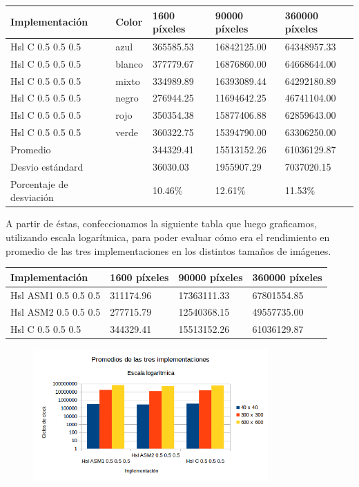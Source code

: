 \begin{tabular}{| l | l | l | l | l |}
\hline
Implementación & Color & 1600 píxeles & 90000 píxeles & 360000 píxeles\\
\hline
Hsl C 0.5 0.5 0.5 & azul &  365585.53 & 16842125.00 & 64348957.33\\ 
\hline
Hsl C 0.5 0.5 0.5 & blanco & 377779.67 & 16876860.00 & 64668644.00\\ 
\hline
Hsl C 0.5 0.5 0.5 & mixto & 334989.89 & 16393089.44 & 64292180.89\\ 
\hline
Hsl C 0.5 0.5 0.5 & negro & 276944.25 & 11694642.25 & 46741104.00\\
\hline
Hsl C 0.5 0.5 0.5 & rojo &  350354.38 & 15877406.88 & 62859643.00\\
\hline
Hsl C 0.5 0.5 0.5 & verde &  360322.75 & 15394790.00 & 63306250.00\\ 
\hline
Promedio & &  344329.41 & 15513152.26 & 61036129.87\\
\hline
Desvio estándard  &&  36030.03  & 1955907.29 & 7037020.15\\
\hline
Porcentaje de desviación  && 10.46\% & 12.61\% &  11.53\%\\
\hline
\end{tabular}

A partir de éstas, confeccionamos la siguiente tabla que luego graficamos, utilizando escala logarítmica, para poder evaluar cómo era el rendimiento en promedio de las tres implementaciones en los distintos tamaños de imágenes.\\

\begin{tabular}{| l | l | l | l|}
\hline
Implementación	& 1600 píxeles & 90000 píxeles & 360000 píxeles\\
\hline
Hsl ASM1 0.5 0.5 0.5	& 311174.96	& 17363111.33 & 	67801554.85\\
\hline
Hsl ASM2 0.5 0.5 0.5	& 277715.79	& 12540368.15	& 49557735.00\\
\hline
Hsl C 0.5 0.5 0.5	& 344329.41	& 15513152.26	& 61036129.87\\
\hline
\end{tabular}

\begin{figure}[ht]
\centering
\includegraphics[width=90mm]{hsl/graficoHsl.png}
\end{figure}

